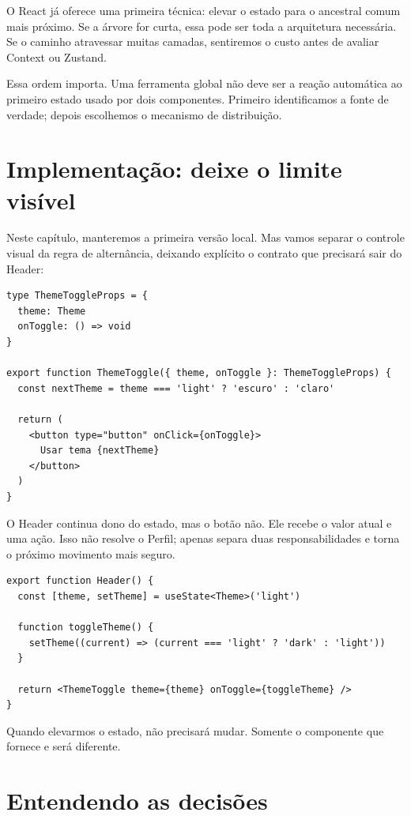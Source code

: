 O React já oferece uma primeira técnica: elevar o estado para o ancestral comum
mais próximo. Se a árvore for curta, essa pode ser toda a arquitetura necessária.
Se o caminho atravessar muitas camadas, sentiremos o custo antes de avaliar
Context ou Zustand.

Essa ordem importa. Uma ferramenta global não deve ser a reação automática ao
primeiro estado usado por dois componentes. Primeiro identificamos a fonte de
verdade; depois escolhemos o mecanismo de distribuição.

\section{Implementação: deixe o limite visível}

Neste capítulo, manteremos a primeira versão local. Mas vamos separar o controle
visual da regra de alternância, deixando explícito o contrato que precisará sair
do Header:

\begin{lstlisting}[caption={O botão recebe o valor e a ação de que precisa.}]
type ThemeToggleProps = {
  theme: Theme
  onToggle: () => void
}

export function ThemeToggle({ theme, onToggle }: ThemeToggleProps) {
  const nextTheme = theme === 'light' ? 'escuro' : 'claro'

  return (
    <button type="button" onClick={onToggle}>
      Usar tema {nextTheme}
    </button>
  )
}
\end{lstlisting}

O Header continua dono do estado, mas o botão não. Ele recebe o valor atual e
uma ação. Isso não resolve o Perfil; apenas separa duas responsabilidades e
torna o próximo movimento mais seguro.

\begin{lstlisting}[caption={A fonte de verdade ainda está local.}]
export function Header() {
  const [theme, setTheme] = useState<Theme>('light')

  function toggleTheme() {
    setTheme((current) => (current === 'light' ? 'dark' : 'light'))
  }

  return <ThemeToggle theme={theme} onToggle={toggleTheme} />
}
\end{lstlisting}

Quando elevarmos o estado,  não precisará mudar. Somente o
componente que fornece  e  será diferente.

\section{Entendendo as decisões}

